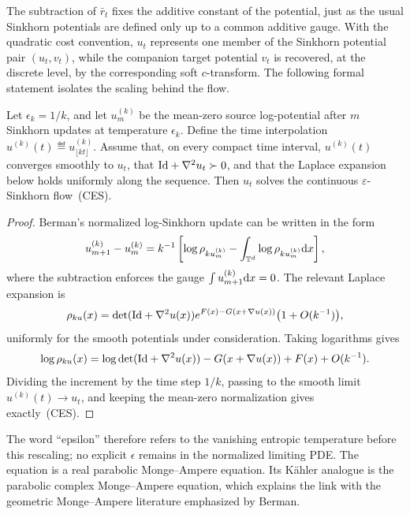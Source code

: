 The subtraction of $\bar r_t$ fixes the additive constant of the potential, just as the usual Sinkhorn potentials are defined only up to a common additive gauge.  With the quadratic cost convention, $u_t$ represents one member of the Sinkhorn potential pair $(u_t,v_t)$, while the companion target potential $v_t$ is recovered, at the discrete level, by the corresponding soft $c$-transform.  The following formal statement isolates the scaling behind the flow.

\begin{prop}\label{prop-scaled-log-sinkhorn-limit}
	Let $\epsilon_k=1/k$, and let $u_m^{(k)}$ be the mean-zero source log-potential after $m$ Sinkhorn updates at temperature $\epsilon_k$.  Define the time interpolation $u^{(k)}(t)\eqdef u_{\lfloor kt\rfloor}^{(k)}$.  Assume that, on every compact time interval, $u^{(k)}(t)$ converges smoothly to $u_t$, that $\mathrm{Id}+\nabla^2u_t\succ0$, and that the Laplace expansion below holds uniformly along the sequence.  Then $u_t$ solves the continuous \(\varepsilon\)-Sinkhorn flow~\textup{(CES)}.
\end{prop}

\begin{proof}
	Berman's normalized log-Sinkhorn update can be written in the form
	\[
		u_{m+1}^{(k)}-u_m^{(k)}
		=
		k^{-1}
		\left[
		\log\rho_{k u_m^{(k)}}-
		\int_{\mathbb{T}^d}\log\rho_{k u_m^{(k)}}\mathrm{d} x
		\right],
	\]
	where the subtraction enforces the gauge $\int u_{m+1}^{(k)}\mathrm{d} x=0$.  The relevant Laplace expansion is
	\[
		\rho_{ku}(x)
		=
		\det(\mathrm{Id}+\nabla^2u(x))
		e^{F(x)-G(x+\nabla u(x))}
		\big(1+O(k^{-1})\big),
	\]
	uniformly for the smooth potentials under consideration.  Taking logarithms gives
	\[
		\log\rho_{ku}(x)
		=
		\log\det(\mathrm{Id}+\nabla^2u(x))
		-G(x+\nabla u(x))+F(x)+O(k^{-1}).
	\]
	Dividing the increment by the time step $1/k$, passing to the smooth limit $u^{(k)}(t)\to u_t$, and keeping the mean-zero normalization gives exactly~\textup{(CES)}.
\end{proof}

The word ``epsilon'' therefore refers to the vanishing entropic temperature before this rescaling; no explicit $\epsilon$ remains in the normalized limiting PDE.  The equation is a real parabolic Monge--Ampere equation.  Its K\"ahler analogue is the parabolic complex Monge--Ampere equation, which explains the link with the geometric Monge--Ampere literature emphasized by Berman.

